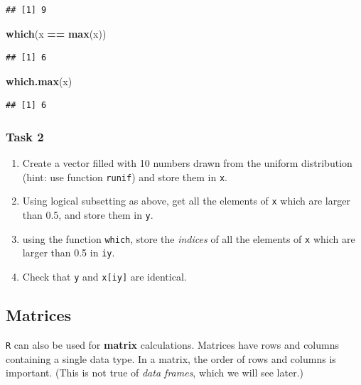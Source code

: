 \documentclass[]{book}
\newenvironment{Shaded}{\begin{snugshade}}{\end{snugshade}}
\newcommand{\KeywordTok}[1]{\textcolor[rgb]{0.13,0.29,0.53}{\textbf{#1}}}
\newcommand{\StringTok}[1]{\textcolor[rgb]{0.31,0.60,0.02}{#1}}
\newcommand{\OperatorTok}[1]{\textcolor[rgb]{0.81,0.36,0.00}{\textbf{#1}}}
\newcommand{\NormalTok}[1]{#1}
\providecommand{\tightlist}{%
  \setlength{\itemsep}{0pt}\setlength{\parskip}{0pt}}
\begin{document}
\begin{verbatim}
## [1] 9
\end{verbatim}

\begin{Shaded}
\begin{Highlighting}[]
\KeywordTok{which}\NormalTok{(x }\OperatorTok{==}\StringTok{ }\KeywordTok{max}\NormalTok{(x))}
\end{Highlighting}
\end{Shaded}

\begin{verbatim}
## [1] 6
\end{verbatim}

\begin{Shaded}
\begin{Highlighting}[]
\KeywordTok{which.max}\NormalTok{(x)}
\end{Highlighting}
\end{Shaded}

\begin{verbatim}
## [1] 6
\end{verbatim}

\subsubsection{Task 2}\label{task-2}

\begin{enumerate}
\def\labelenumi{\arabic{enumi}.}
\tightlist
\item
  Create a vector filled with 10 numbers drawn from the uniform
  distribution (hint: use function \texttt{runif}) and store them in
  \texttt{x}.
\item
  Using logical subsetting as above, get all the elements of \texttt{x}
  which are larger than 0.5, and store them in \texttt{y}.
\item
  using the function \texttt{which}, store the \emph{indices} of all the
  elements of \texttt{x} which are larger than 0.5 in \texttt{iy}.
\item
  Check that \texttt{y} and \texttt{x{[}iy{]}} are identical.
\end{enumerate}

\subsection{Matrices}\label{matrices}

\texttt{R} can also be used for \textbf{matrix} calculations. Matrices
have rows and columns containing a single data type. In a matrix, the
order of rows and columns is important. (This is not true of \emph{data
frames}, which we will see later.)
\end{document}
